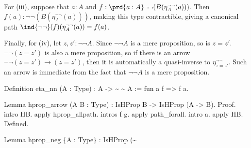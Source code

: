 For (iii), suppose that $a : A$ and $f : \prd{a :
A}\lnot\lnot(B(\eta^{\lnot\lnot}_{A}(a)))$.  Then $f(a) : \lnot \lnot
(B(\eta^{\lnot\lnot}_{A}(a)))$, making this type contractible, giving a
canonical path $\ind{\lnot\lnot}(f)(\eta^{\lnot\lnot}_{A}(a)) = f(a)$.


Finally, for (iv), let $z, z' : \lnot\lnot A$.  Since $\lnot\lnot A$ is a mere
proposition, so is $z = z'$.  $\lnot\lnot(z = z')$ is also a mere proposition,
so if there is an arrow $\lnot\lnot(z = z') \to (z = z')$, then it is
automatically a quasi-inverse to $\eta^{\lnot\lnot}_{z = z'}$.  Such an arrow
is immediate from the fact that $\lnot \lnot A$ is a mere proposition.
\begin{coqdoccode}
\coqdocemptyline
\coqdocnoindent
\begin{coqdoccomment}
\coqdoceol
Definition\coqdocindent{0.50em}
eta\_nn\coqdocindent{0.50em}
(A\coqdocindent{0.50em}
:\coqdocindent{0.50em}
Type)\coqdocindent{0.50em}
:\coqdocindent{0.50em}
A\coqdocindent{0.50em}
->\coqdocindent{0.50em}
\~{}\coqdocindent{0.50em}
\~{}\coqdocindent{0.50em}
A\coqdocindent{0.50em}
:=\coqdocindent{0.50em}
fun\coqdocindent{0.50em}
a\coqdocindent{0.50em}
f\coqdocindent{0.50em}
=>\coqdocindent{0.50em}
f\coqdocindent{0.50em}
a.\coqdoceol
\end{coqdoccomment}
\coqdoceol
\coqdocemptyline
\coqdocnoindent
\begin{coqdoccomment}
\coqdoceol
Lemma\coqdocindent{0.50em}
hprop\_arrow\coqdocindent{0.50em}
(A\coqdocindent{0.50em}
B\coqdocindent{0.50em}
:\coqdocindent{0.50em}
Type)\coqdocindent{0.50em}
:\coqdocindent{0.50em}
IsHProp\coqdocindent{0.50em}
B\coqdocindent{0.50em}
->\coqdocindent{0.50em}
IsHProp\coqdocindent{0.50em}
(A\coqdocindent{0.50em}
->\coqdocindent{0.50em}
B).\coqdoceol
Proof.\coqdoceol
\coqdocindent{1.00em}
intro\coqdocindent{0.50em}
HB.\coqdoceol
\coqdocindent{1.00em}
apply\coqdocindent{0.50em}
hprop\_allpath.\coqdocindent{0.50em}
intros\coqdocindent{0.50em}
f\coqdocindent{0.50em}
g.\coqdocindent{0.50em}
apply\coqdocindent{0.50em}
path\_forall.\coqdocindent{0.50em}
intro\coqdocindent{0.50em}
a.\coqdocindent{0.50em}
apply\coqdocindent{0.50em}
HB.\coqdoceol
Defined.\coqdoceol
\end{coqdoccomment}
\coqdoceol
\coqdocemptyline
\coqdocnoindent
\begin{coqdoccomment}
\coqdoceol
Lemma\coqdocindent{0.50em}
hprop\_neg\coqdocindent{0.50em}
\{A\coqdocindent{0.50em}
:\coqdocindent{0.50em}
Type\}\coqdocindent{0.50em}
:\coqdocindent{0.50em}
IsHProp\coqdocindent{0.50em}
(\~{}\coqdocindent{0.50em}

\end{coqdoccomment}
\end{coqdoccode}
